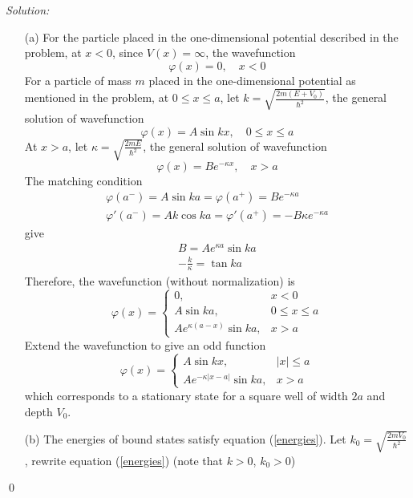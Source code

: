 \documentclass[12pt,a4paper]{article}
\newenvironment{sol}
    {\emph{Solution:}
    }
    {
    \qed
    }
\begin{document}
\begin{sol}
\begin{itemize}
\item[(a)] For the particle placed in the one-dimensional potential described in the problem, at $x<0$, since $V(x)=\infty$, the wavefunction
\begin{equation}
\varphi(x)=0,\quad x<0
\end{equation}
For a particle of mass $m$ placed in the one-dimensional potential as mentioned in the problem, at $0\leq x\leq a$, let $k=\sqrt{\frac{2m(E+V_0)}{\hbar^2}}$, the general solution of wavefunction
\begin{equation}
\varphi(x)=A\sin kx,\quad 0\leq x\leq a
\end{equation}
At $x>a$, let $\kappa=\sqrt{\frac{2mE}{\hbar^2}}$, the general solution of wavefunction
\begin{equation}
\varphi(x)=Be^{-\kappa x},\quad x>a
\end{equation}
The matching condition
\begin{gather}
\varphi(a^-)=A\sin ka=\varphi(a^+)=Be^{-\kappa a}\\
\varphi'(a^-)=Ak\cos ka=\varphi'(a^+)=-B\kappa e^{-\kappa a}
\end{gather}
give
\begin{gather}
B=Ae^{\kappa a}\sin ka\\
\label{energies}-\frac{k}{\kappa}=\tan ka
\end{gather}
Therefore, the wavefunction (without normalization) is
\begin{equation}
\varphi(x)=
\left\{\begin{array}{ll}
0,&x<0\\
A\sin ka,&0\leq x\leq a\\
Ae^{\kappa(a-x)}\sin ka,&x>a
\end{array}\right.
\end{equation}
Extend the wavefunction to give an odd function
\begin{equation}
\varphi(x)=
\left\{\begin{array}{ll}
A\sin kx,&|x|\leq a\\
Ae^{-\kappa|x-a|}\sin ka,&x>a
\end{array}\right.
\end{equation}
which corresponds to a stationary state for a square well of width $2a$ and depth $V_0$.
\item[(b)] The energies of bound states satisfy equation (\ref{energies}). Let $k_0=\sqrt{\frac{2mV_0}{\hbar^2}}$, rewrite equation (\ref{energies}) (note that $k>0$, $k_0>0$)

\end{itemize}
\end{sol}
\end{document}
